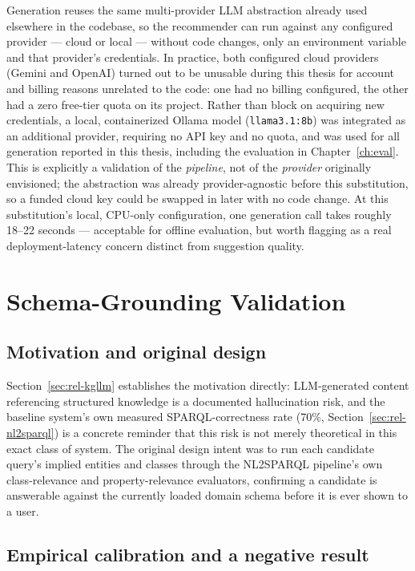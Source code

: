 \documentclass[11pt,a4paper,oneside]{book}
\newcommand{\code}[1]{\texttt{#1}}
\begin{document}
Generation reuses the same multi-provider LLM abstraction already used elsewhere in the codebase,
so the recommender can run against any configured provider --- cloud or local --- without code
changes, only an environment variable and that provider's credentials. In practice, both configured
cloud providers (Gemini and OpenAI) turned out to be unusable during this thesis for account and
billing reasons unrelated to the code: one had no billing configured, the other had a zero free-tier
quota on its project. Rather than block on acquiring new credentials, a local, containerized Ollama
model (\code{llama3.1:8b}) was integrated as an additional provider, requiring no API key and no
quota, and was used for all generation reported in this thesis, including the evaluation in
Chapter~\ref{ch:eval}. This is explicitly a validation of the \emph{pipeline}, not of the
\emph{provider} originally envisioned; the abstraction was already provider-agnostic before this
substitution, so a funded cloud key could be swapped in later with no code change. At this
substitution's local, CPU-only configuration, one generation call takes roughly 18--22 seconds ---
acceptable for offline evaluation, but worth flagging as a real deployment-latency concern distinct
from suggestion quality.

\section{Schema-Grounding Validation}
\label{sec:rec-validation}

\subsection{Motivation and original design}

Section~\ref{sec:rel-kgllm} establishes the motivation directly: LLM-generated content referencing
structured knowledge is a documented hallucination risk, and the baseline system's own measured
SPARQL-correctness rate (70\%, Section~\ref{sec:rel-nl2sparql}) is a concrete reminder that this
risk is not merely theoretical in this exact class of system. The original design intent was to run
each candidate query's implied entities and classes through the NL2SPARQL pipeline's own
class-relevance and property-relevance evaluators, confirming a candidate is answerable against the
currently loaded domain schema before it is ever shown to a user.

\subsection{Empirical calibration and a negative result}
\end{document}
